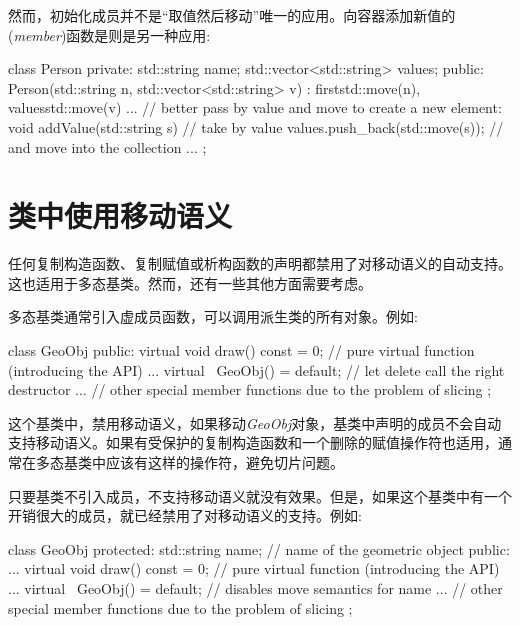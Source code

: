 然而，初始化成员并不是“取值然后移动”唯一的应用。向容器添加新值的(\textit{member})函数是则是另一种应用:\par

\begin{codebox}[cpp]
class Person {
private:
  std::string name;
  std::vector<std::string> values;
public:
  Person(std::string n, std::vector<std::string> v)
  : first{std::move(n)}, values{std::move(v)} {
  }
  ...
  // better pass by value and move to create a new element:
  void addValue(std::string s) { // take by value
    values.push_back(std::move(s)); // and move into the collection
  }
  ...
};
\end{codebox}


\section{类中使用移动语义}

任何复制构造函数、复制赋值或析构函数的声明都禁用了对移动语义的自动支持。这也适用于多态基类。然而，还有一些其他方面需要考虑。\par


多态基类通常引入虚成员函数，可以调用派生类的所有对象。例如:\par

\begin{codebox}[cpp]
class GeoObj {
  public:
  virtual void draw() const = 0; // pure virtual function (introducing the API)
  ...
  virtual ~GeoObj() = default; // let delete call the right destructor
  ... // other special member functions due to the problem of slicing
};
\end{codebox}

这个基类中，禁用移动语义，如果移动\textit{GeoObj}对象，基类中声明的成员不会自动支持移动语义。如果有受保护的复制构造函数和一个删除的赋值操作符也适用，通常在多态基类中应该有这样的操作符，避免切片问题。\par

只要基类不引入成员，不支持移动语义就没有效果。但是，如果这个基类中有一个开销很大的成员，就已经禁用了对移动语义的支持。例如:\par

\begin{codebox}[cpp]
class GeoObj {
protected:
  std::string name; // name of the geometric object
public:
  ...
  virtual void draw() const = 0; // pure virtual function (introducing the API)
  ...
  virtual ~GeoObj() = default; // disables move semantics for name
  ... // other special member functions due to the problem of slicing
};
\end{codebox}

